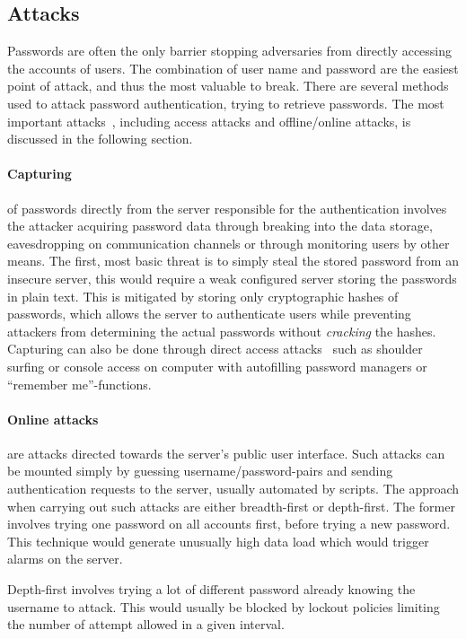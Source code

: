 \subsection{Attacks}\label{atck}
Passwords are often the only barrier stopping adversaries from directly accessing the accounts of users. The combination of user name and password are the easiest point of attack, and thus the most valuable to break. There are several methods used to attack password authentication, trying to retrieve passwords. The most important attacks~\cite{nist-guide, strong-pws_florencio}, including access attacks and offline/online attacks, is discussed in the following section. 
\paragraph{Capturing} of passwords directly from the server responsible for the authentication involves the attacker acquiring password data through breaking into the data storage, eavesdropping on communication channels or through monitoring users by other means. The first, most basic threat is to simply steal the stored password from an insecure server, this would require a weak configured server storing the passwords in plain text. This is mitigated by storing only cryptographic hashes of passwords, which allows the server to authenticate users while preventing attackers from determining the actual passwords without \emph{cracking} the hashes. Capturing can also be done through direct access attacks~\cite{guide-pws} such as shoulder surfing or console access on computer with autofilling password managers or ``remember me''-functions.

\paragraph{Online attacks} are attacks directed towards the server's public user interface. Such attacks can be mounted simply by guessing username/password-pairs and sending authentication requests to the server, usually automated by scripts. The approach when carrying out such attacks are either breadth-first or depth-first. The former involves trying one password on all accounts first, before trying a new password. This technique would generate unusually high data load which would trigger alarms on the server. 
\par Depth-first involves trying a lot of different password already knowing the username to attack. This would usually be blocked by lockout policies limiting the number of attempt allowed in a given interval.

